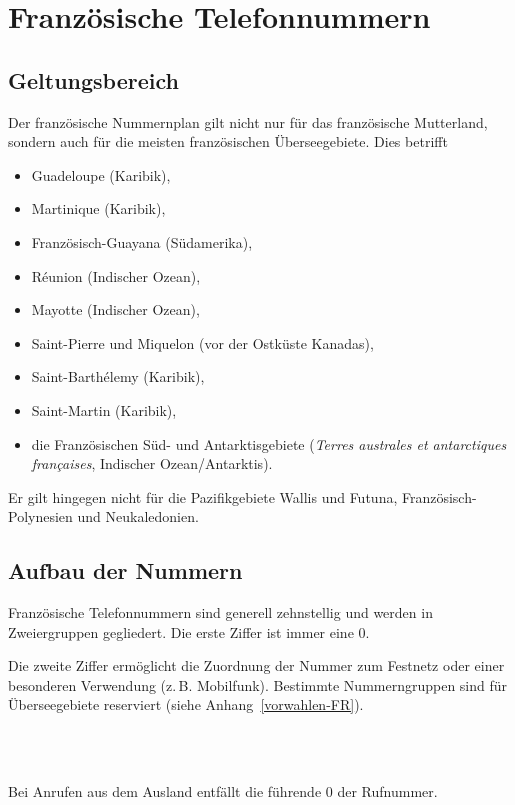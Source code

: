 \documentclass[numbers=noenddot]{scrreprt}
\newcommand\Abschnittsliteratur[1]{\bgroup
\small
\raggedright
\printbibliography[heading=subbibnumbered,keyword=#1]
\egroup}
\newcommand\UeberschriftGeltungsbereich{\section{Geltungsbereich}}
\newcommand\UeberschriftAufbau{\section{Aufbau der Nummern}}
\newcommand*\sieheAnhang[1]{(siehe Anhang~\ref{#1})}
\begin{document}
\Abschnittsliteratur{austrian}

\chapter{Französische Telefonnummern}
\UeberschriftGeltungsbereich \label{FR-bereich}
Der französische Nummernplan
\cite{ARCEP}
gilt nicht nur für das französische Mutterland, sondern auch für die meisten französischen Überseegebiete. Dies betrifft
\begin{itemize}
\item Guadeloupe (Karibik),
\item Martinique (Karibik),
\item Französisch-Guayana (Südamerika),
\item R\'eunion (Indischer Ozean),
\item Mayotte (Indischer Ozean),
\item Saint-Pierre und Miquelon (vor der Ostküste Kanadas),
\item Saint-Barth\'elemy (Karibik),
\item Saint-Martin (Karibik),
\item die Französischen Süd- und Antarktisgebiete (\emph{\foreignlanguage{french}{Terres australes et antarctiques françaises}}, Indischer Ozean/Antarktis).
\end{itemize}
Er gilt hingegen nicht für die Pazifikgebiete Wallis und Futuna, Französisch-Polynesien und Neukaledonien.

\UeberschriftAufbau
Französische Telefonnummern sind generell zehnstellig und werden in Zweiergruppen gegliedert. Die erste Ziffer ist immer eine 0.
\begin{sidebyside}
\end{sidebyside}
Die zweite Ziffer ermöglicht die Zuordnung der Nummer zum Festnetz oder einer besonderen Verwendung (z.\,B. Mobilfunk). Bestimmte Nummerngruppen sind für Überseegebiete reserviert
\sieheAnhang{vorwahlen-FR}.
\begin{sidebyside}
   \\
   \\
\end{sidebyside}

Bei Anrufen aus dem Ausland entfällt die führende 0 der Rufnummer.
\begin{sidebyside}
\end{sidebyside}
\end{document}
